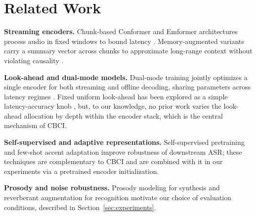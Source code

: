 \section{Related Work}
\textbf{Streaming encoders.} Chunk-based Conformer and Emformer architectures process audio in fixed
windows to bound latency \citep{okonkwo2024conformer}. Memory-augmented variants carry a summary vector
across chunks to approximate long-range context without violating causality
\citep{bergman2018lstm,kowalski2022diarization}.

\textbf{Look-ahead and dual-mode models.} Dual-mode training jointly optimizes a single encoder for both
streaming and offline decoding, sharing parameters across latency regimes \citep{martinez2022rnnt}.
Fixed uniform look-ahead has been explored as a simple latency-accuracy knob
\citep{fischer2020ctc,silva2019vad}, but, to our knowledge, no prior work varies the look-ahead
allocation by depth within the encoder stack, which is the central mechanism of CBCI.

\textbf{Self-supervised and adaptive representations.} Self-supervised pretraining
\citep{tanaka2021selfsup,schmidt2023wav2vec} and few-shot accent adaptation \citep{nakamura2023fewshot}
improve robustness of downstream ASR; these techniques are complementary to CBCI and are combined with
it in our experiments via a pretrained encoder initialization.

\textbf{Prosody and noise robustness.} Prosody modeling for synthesis \citep{gomez2020prosody} and
reverberant augmentation for recognition \citep{andersson2021noise} motivate our choice of evaluation
conditions, described in Section~\ref{sec:experiments}.
